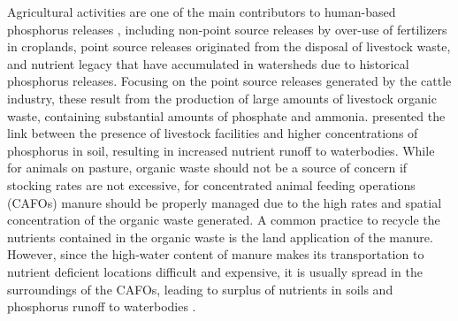 \begin{refsection}[referencesCh4]
Agricultural activities are one of the main contributors to human-based phosphorus releases \citep{Dzombak}, including non-point source releases by over-use of fertilizers in croplands, point source releases originated from the disposal of livestock waste, and nutrient legacy that have accumulated in watersheds due to historical phosphorus releases. Focusing on the point source releases generated by the cattle industry, these result from the production of large amounts of livestock organic waste, containing substantial amounts of phosphate and ammonia. \citet{Sampat2017} presented the link between the presence of livestock facilities and higher concentrations of phosphorus in soil, resulting in increased nutrient runoff to waterbodies. While for animals on pasture, organic waste should not be a source of concern if stocking rates are not excessive, for concentrated animal feeding operations (CAFOs) manure should be properly managed due to the high rates and spatial concentration of the organic waste generated.
A common practice to recycle the nutrients contained in the organic waste is the land application of the manure. However, since the high-water content of manure makes its transportation to nutrient deficient locations difficult and expensive, it is usually spread in the surroundings of the CAFOs, leading to surplus of nutrients in soils and phosphorus runoff to waterbodies \citep{USDAHandbook}.


\end{refsection}
